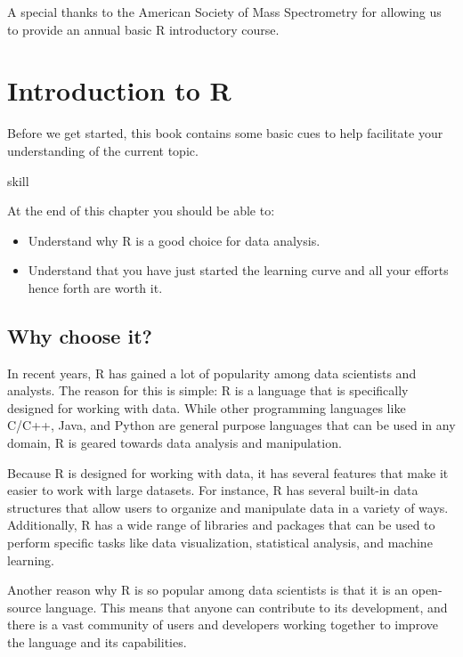 \documentclass[
]{book}
\begin{document}
A special thanks to the American Society of Mass Spectrometry for allowing us to provide an annual basic R introductory course.

\hypertarget{introduction-to-r}{%
\chapter{Introduction to R}\label{introduction-to-r}}

Before we get started, this book contains some basic cues to help facilitate your understanding of the current topic.

\begin{infobox}{skill}

At the end of this chapter you should be able to:

\begin{itemize}
\item
  Understand why R is a good choice for data analysis.
\item
  Understand that you have just started the learning curve and all your efforts hence forth are worth it.
\end{itemize}

\end{infobox}

\hypertarget{why-choose-it}{%
\section*{Why choose it?}\label{why-choose-it}}

In recent years, R has gained a lot of popularity among data scientists and analysts. The reason for this is simple: R is a language that is specifically designed for working with data. While other programming languages like C/C++, Java, and Python are general purpose languages that can be used in any domain, R is geared towards data analysis and manipulation.

Because R is designed for working with data, it has several features that make it easier to work with large datasets. For instance, R has several built-in data structures that allow users to organize and manipulate data in a variety of ways. Additionally, R has a wide range of libraries and packages that can be used to perform specific tasks like data visualization, statistical analysis, and machine learning.

Another reason why R is so popular among data scientists is that it is an open-source language. This means that anyone can contribute to its development, and there is a vast community of users and developers working together to improve the language and its capabilities.
\end{document}
